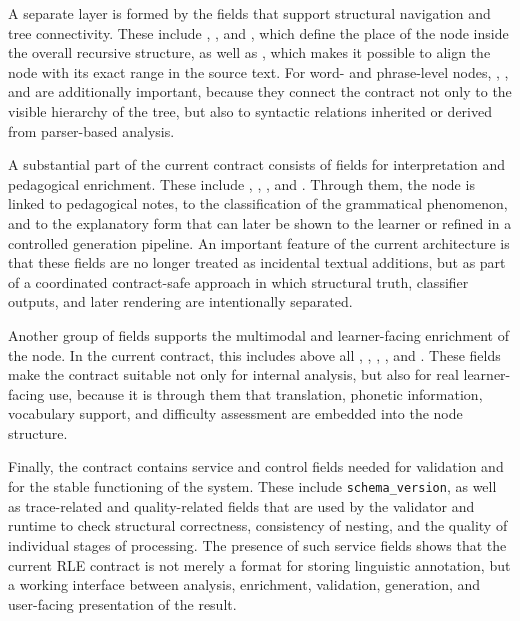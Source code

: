 \documentclass[12pt,a4paper,oneside]{report}
\begin{document}
A separate layer is formed by the fields that support structural navigation and tree connectivity. These include , , and , which define the place of the node inside the overall recursive structure, as well as , which makes it possible to align the node with its exact range in the source text. For word- and phrase-level nodes, , , and  are additionally important, because they connect the contract not only to the visible hierarchy of the tree, but also to syntactic relations inherited or derived from parser-based analysis.

A substantial part of the current contract consists of fields for interpretation and pedagogical enrichment. These include , , , and . Through them, the node is linked to pedagogical notes, to the classification of the grammatical phenomenon, and to the explanatory form that can later be shown to the learner or refined in a controlled generation pipeline. An important feature of the current architecture is that these fields are no longer treated as incidental textual additions, but as part of a coordinated contract-safe approach in which structural truth, classifier outputs, and later rendering are intentionally separated.

Another group of fields supports the multimodal and learner-facing enrichment of the node. In the current contract, this includes above all , , , , and . These fields make the contract suitable not only for internal analysis, but also for real learner-facing use, because it is through them that translation, phonetic information, vocabulary support, and difficulty assessment are embedded into the node structure.

Finally, the contract contains service and control fields needed for validation and for the stable functioning of the system. These include \texttt{schema\_version}, as well as trace-related and quality-related fields that are used by the validator and runtime to check structural correctness, consistency of nesting, and the quality of individual stages of processing. The presence of such service fields shows that the current RLE contract is not merely a format for storing linguistic annotation, but a working interface between analysis, enrichment, validation, generation, and user-facing presentation of the result.
\end{document}
